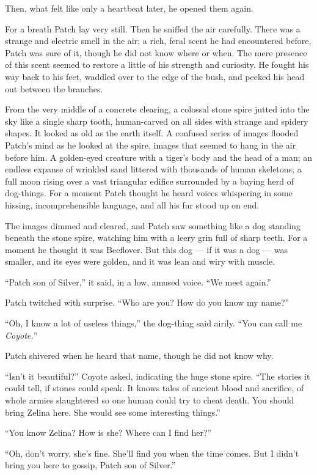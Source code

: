 \documentclass[ebook,oneside,openany,12pt]{memoir}
\begin{document}
Then, what felt like only a heartbeat later, he opened them again.

For a breath Patch lay very still. Then he sniffed the air
carefully. There was a strange and electric smell in the air; a rich,
feral scent he had encountered before, Patch was sure of it, though he
did not know where or when. The mere presence of this scent seemed to
restore a little of his strength and curiosity. He fought his way back
to his feet, waddled over to the edge of the bush, and peeked his head
out between the branches.

From the very middle of a concrete clearing, a colossal stone spire
jutted into the sky like a single sharp tooth, human-carved on all
sides with strange and spidery shapes. It looked as old as the earth
itself. A confused series of images flooded Patch’s mind as he looked
at the spire, images that seemed to hang in the air before him. A
golden-eyed creature with a tiger’s body and the head of a man; an
endless expanse of wrinkled sand littered with thousands of human
skeletons; a full moon rising over a vast triangular edifice
surrounded by a baying herd of dog-things. For a moment Patch thought
he heard voices whispering in some hissing, incomprehensible language,
and all his fur stood up on end.

The images dimmed and cleared, and Patch saw something like a dog
standing beneath the stone spire, watching him with a leery grin full
of sharp teeth. For a moment he thought it was Beeflover. But this dog
— if it was a dog — was smaller, and its eyes were golden, and it was
lean and wiry with muscle.

“Patch son of Silver,” it said, in a low, amused voice. “We meet
again.”

Patch twitched with surprise. “Who are you? How do you know my name?”

“Oh, I know a lot of useless things,” the dog-thing said airily. “You
can call me \emph{Coyote.}”

Patch shivered when he heard that name, though he did not know why.

“Isn’t it beautiful?” Coyote asked, indicating the huge stone
spire. “The stories it could tell, if stones could speak. It knows
tales of ancient blood and sacrifice, of whole armies slaughtered so
one human could try to cheat death. You should bring Zelina here. She
would see some interesting things.”

“You know Zelina? How is she? Where can I find her?”

“Oh, don’t worry, she’s fine. She’ll find you when the time comes. But
I didn’t bring you here to gossip, Patch son of Silver.”
\end{document}
